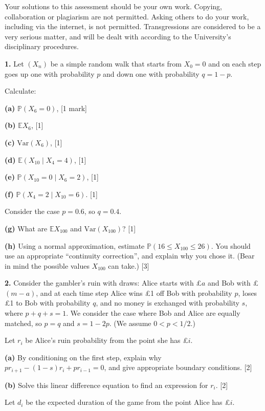 \documentclass[
  a4paper,
]{article}
\theoremstyle{definition}
\theoremstyle{definition}
\theoremstyle{definition}
\theoremstyle{remark}
\begin{document}
Your solutions to this assessment should be your own work. Copying, collaboration or plagiarism are not permitted. Asking others to do your work, including via the internet, is not permitted. Transgressions are considered to be a very serious matter, and will be dealt with according to the University's disciplinary procedures.

\textbf{1.} Let \((X_n)\) be a simple random walk that starts from \(X_0 = 0\) and on each step goes up one with probability \(p\) and down one with probability \(q = 1-p\).

Calculate:

\textbf{(a)} \(\mathbb P(X_6 = 0)\), {{[}1 mark{]}}

\textbf{(b)} \(\mathbb EX_6\), {{[}1{]}}

\textbf{(c)} \(\text{Var}(X_6)\), {{[}1{]}}

\textbf{(d)} \(\mathbb E(X_{10} \mid X_4 = 4)\), {{[}1{]}}

\textbf{(e)} \(\mathbb P(X_{10} = 0 \mid X_6 = 2)\), {{[}1{]}}

\textbf{(f)} \(\mathbb P(X_4 = 2 \mid X_{10} = 6)\). {{[}1{]}}

Consider the case \(p = 0.6\), so \(q = 0.4\).

\textbf{(g)} What are \(\mathbb E X_{100}\) and \(\text{Var}(X_{100})\)? {{[}1{]}}

\textbf{(h)} Using a normal approximation, estimate \(\mathbb P(16 \leq X_{100} \leq 26)\). You should use an appropriate ``continuity correction'', and explain why you chose it. (Bear in mind the possible values \(X_{100}\) can take.) {{[}3{]}}

\textbf{2.} Consider the gambler's ruin with draws: Alice starts with £\(a\) and Bob with £\((m-a)\), and at each time step Alice wins £1 off Bob with probability \(p\), loses £1 to Bob with probability \(q\), and no money is exchanged with probability \(s\), where \(p+q+s =1\). We consider the case where Bob and Alice are equally matched, so \(p = q\) and \(s = 1-2p\). (We assume \(0 < p < 1/2\).)

Let \(r_i\) be Alice's ruin probability from the point she has £\(i\).

\textbf{(a)} By conditioning on the first step, explain why \(pr_{i+1} - (1-s)r_i + pr_{i-1} = 0\), and give appropriate boundary conditions. {{[}2{]}}

\textbf{(b)} Solve this linear difference equation to find an expression for \(r_i\). {{[}2{]}}

Let \(d_i\) be the expected duration of the game from the point Alice has £\(i\).
\end{document}
